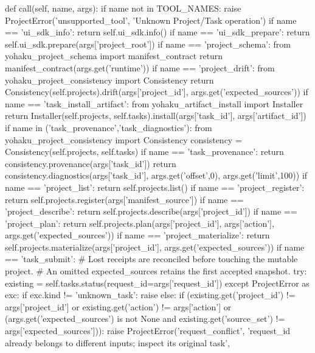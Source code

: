     def call(self, name, args):
        if name not in TOOL_NAMES:
            raise ProjectError('unsupported_tool', 'Unknown Project/Task operation')
        if name == 'ui_sdk_info':
            return self.ui_sdk.info()
        if name == 'ui_sdk_prepare':
            return self.ui_sdk.prepare(args['project_root'])
        if name == 'project_schema':
            from yohaku_project_schema import manifest_contract
            return manifest_contract(args.get('runtime'))
        if name == 'project_drift':
            from yohaku_project_consistency import Consistency
            return Consistency(self.projects).drift(args['project_id'], args.get('expected_sources'))
        if name == 'task_install_artifact':
            from yohaku_artifact_install import Installer
            return Installer(self.projects, self.tasks).install(args['task_id'], args['artifact_id'])
        if name in ('task_provenance','task_diagnostics'):
            from yohaku_project_consistency import Consistency
            consistency = Consistency(self.projects, self.tasks)
            if name == 'task_provenance':
                return consistency.provenance(args['task_id'])
            return consistency.diagnostics(args['task_id'], args.get('offset',0), args.get('limit',100))
        if name == 'project_list':
            return self.projects.list()
        if name == 'project_register':
            return self.projects.register(args['manifest_source'])
        if name == 'project_describe':
            return self.projects.describe(args['project_id'])
        if name == 'project_plan':
            return self.projects.plan(args['project_id'], args['action'], args.get('expected_sources'))
        if name == 'project_materialize':
            return self.projects.materialize(args['project_id'], args.get('expected_sources'))
        if name == 'task_submit':
            # Lost receipts are reconciled before touching the mutable project.
            # An omitted expected_sources retains the first accepted snapshot.
            try:
                existing = self.tasks.status(request_id=args['request_id'])
            except ProjectError as exc:
                if exc.kind != 'unknown_task':
                    raise
            else:
                if (existing.get('project_id') != args['project_id']
                        or existing.get('action') != args['action']
                        or (args.get('expected_sources') is not None
                            and existing.get('source_set') != args['expected_sources'])):
                    raise ProjectError('request_conflict', 'request_id already belongs to different inputs; inspect its original task',
